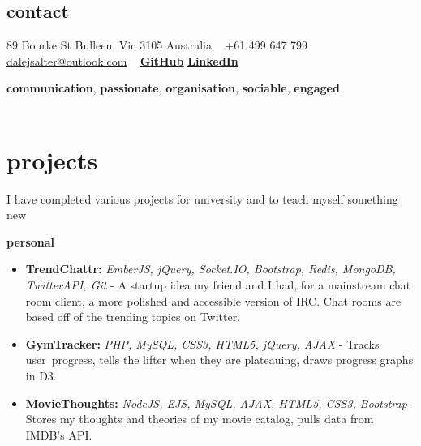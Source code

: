 \documentclass[]{friggeri-cv} %
\begin{document}

\begin{aside} %
\section{contact}
89 Bourke St
Bulleen, Vic 3105
Australia
~
+61 499 647 799
~
\href{mailto:dalejsalter@outlook.com}{dalejsalter@outlook.com}
~
\underline{\textbf{\href{https://github.com/Compulsed/}{GitHub}}}
\underline{\textbf{\href{https://au.linkedin.com/in/dalesalter}{LinkedIn}}}
\end{aside}


\textbf{communication}, \textbf{passionate}, \textbf{organisation}, \textbf{sociable}, \textbf{engaged} \\ \\

\section{projects}
I have completed various projects for university and to teach myself something new

{
  \large\textbf{personal}
}
\begin{itemize}
    \item \textbf{TrendChattr:} \emph{EmberJS, jQuery, Socket.IO, Bootstrap, Redis, MongoDB, TwitterAPI, Git} -
        A startup idea my friend and I had, for a mainstream chat room client, a more polished
         and accessible version of IRC.
        Chat rooms are based off of the trending topics on Twitter.
    \item \textbf{GymTracker:} \emph{PHP, MySQL, CSS3, HTML5, jQuery, AJAX} -
        Tracks user progress, tells the lifter when they are plateauing, draws progress graphs in D3.
    \item \textbf{MovieThoughts:} \emph{NodeJS, EJS, MySQL, AJAX, HTML5, CSS3, Bootstrap} -
        Stores my thoughts and theories of my movie catalog, pulls data from IMDB's API.
\end{itemize}
\end{document}
